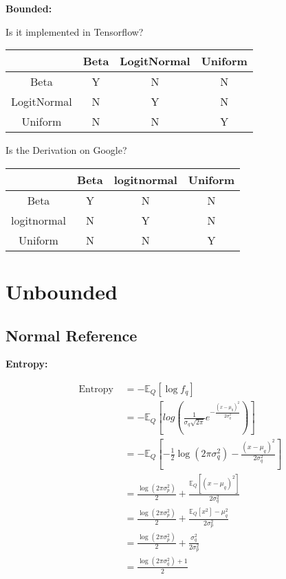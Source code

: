 \documentclass{article}
\begin{document}
\textbf{Bounded:}

Is it implemented in Tensorflow?

\begin{center}
\begin{tabular}{ c | c c c }
 & Beta & LogitNormal & Uniform \\
 \hline
 Beta & Y & N & N \\ 
 LogitNormal & N & Y & N \\  
 Uniform & N & N & Y    
\end{tabular}
\end{center}

Is the Derivation on Google?

\begin{center}
\begin{tabular}{ c | c c c }
 & Beta & logitnormal & Uniform \\
 \hline
 Beta & Y & N & N \\ 
 logitnormal & N & Y & N \\  
 Uniform & N & N & Y    
\end{tabular}
\end{center}



\section{Unbounded}

\subsection{Normal Reference}

\noindent \textbf{Entropy:}

$$ \begin{aligned} \text { Entropy }&=-\mathbb{E}_{Q}\left[\log f_{q}\right] \\ &=-\mathbb{E}_{Q}\left[log(\frac{1}{\sigma_{q} \sqrt{2 \pi}} e^{-\frac{(x-\mu_{q})^{2}}{2 \sigma_{q}^{2}}})\right] \\ &=-\mathbb{E}_{Q}\left[-\frac{1}{2} \log \left(2 \pi \sigma_{q}^{2}\right)-\frac{\left(x-\mu_{q}\right)^{2}}{2 \sigma_{q}^{2}}\right] \\ &=\frac{\log \left(2 \pi \sigma_{p}^{2}\right)}{2}+\frac{\mathbb{E}_{Q}\left[(x-\mu_{q})^2 \right]}{2 \sigma^2_{q}}\\ &=\frac{\log \left(2 \pi \sigma_{p}^{2}\right)}{2}+\frac{\mathbb{E}_{Q}\left[x^2 \right]-\mu_{q}^{2}}{2\sigma^2_{p}}\\ &=\frac{\log \left(2 \pi \sigma_{p}^{2}\right)}{2}+\frac{\sigma_{q}^{2}}{2\sigma^2_{p}}\\ &=\frac{\log \left(2 \pi \sigma_{q}^{2}\right)+1}{2} \end{aligned} $$
\end{document}
